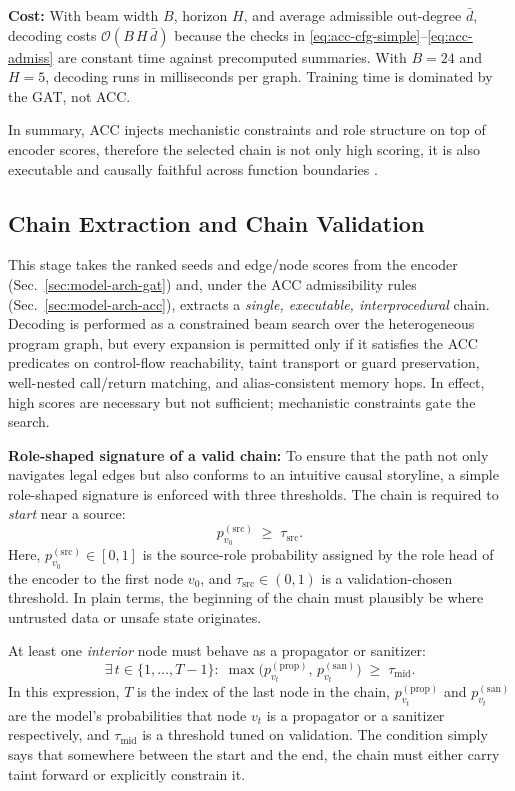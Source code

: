 \documentclass{buthesis}
\begin{document}
\textbf{Cost:}
With beam width $B$, horizon $H$, and average admissible out-degree $\bar d$, decoding costs $\mathcal{O}(B\,H\,\bar d)$ because the checks in \eqref{eq:acc-cfg-simple}–\eqref{eq:acc-admiss} are constant time against precomputed summaries. With $B{=}24$ and $H{=}5$, decoding runs in milliseconds per graph. Training time is dominated by the GAT, not ACC.

\smallskip
In summary, ACC injects mechanistic constraints and role structure on top of encoder scores, therefore the selected chain is not only high scoring, it is also executable and causally faithful across function boundaries \cite{yamaguchi2014cpg}.



\subsection{Chain Extraction and Chain Validation}
\label{sec:model-arch-extract-validate}

This stage takes the ranked seeds and edge/node scores from the encoder (Sec.~\ref{sec:model-arch-gat}) and, under the ACC admissibility rules (Sec.~\ref{sec:model-arch-acc}), extracts a \emph{single, executable, interprocedural} chain. Decoding is performed as a constrained beam search over the heterogeneous program graph, but every expansion is permitted only if it satisfies the ACC predicates on control-flow reachability, taint transport or guard preservation, well-nested call/return matching, and alias-consistent memory hops. In effect, high scores are necessary but not sufficient; mechanistic constraints gate the search.

\textbf{Role-shaped signature of a valid chain:}
To ensure that the path not only navigates legal edges but also conforms to an intuitive causal storyline, a simple role-shaped signature is enforced with three thresholds. The chain is required to \emph{start} near a source:
\begin{equation}
\label{eq:chain-start}
p^{(\mathrm{src})}_{v_0} \;\ge\; \tau_{\mathrm{src}}.
\end{equation}
Here, $p^{(\mathrm{src})}_{v_0}\in[0,1]$ is the source-role probability assigned by the role head of the encoder to the first node $v_0$, and $\tau_{\mathrm{src}}\in(0,1)$ is a validation-chosen threshold. In plain terms, the beginning of the chain must plausibly be where untrusted data or unsafe state originates.

At least one \emph{interior} node must behave as a propagator or sanitizer:
\begin{equation}
\label{eq:chain-middle}
\exists\, t\in\{1,\ldots,T{-}1\}:\;
\max\!\big(p^{(\mathrm{prop})}_{v_t},\,p^{(\mathrm{san})}_{v_t}\big) \;\ge\; \tau_{\mathrm{mid}}.
\end{equation}
In this expression, $T$ is the index of the last node in the chain, $p^{(\mathrm{prop})}_{v_t}$ and $p^{(\mathrm{san})}_{v_t}$ are the model’s probabilities that node $v_t$ is a propagator or a sanitizer respectively, and $\tau_{\mathrm{mid}}$ is a threshold tuned on validation. The condition simply says that somewhere between the start and the end, the chain must either carry taint forward or explicitly constrain it.
\end{document}
